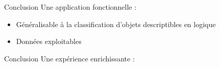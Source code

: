 \begin{frame}{Conclusion}
	Une application fonctionnelle :
		\begin{itemize}
			\item Généralisable à la classification d'objets descriptibles en logique
			\item Données exploitables
		\end{itemize}

\end{frame}

\begin{frame}{Conclusion}
	Une expérience enrichissante :
		\begin{itemize}
		\end{itemize}
\end{frame}